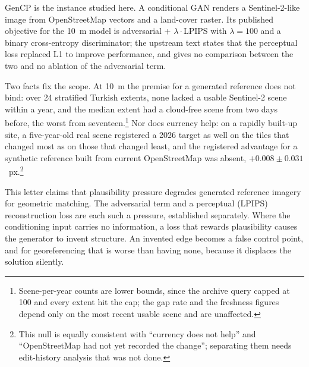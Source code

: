 GenCP \cite{guasch2026gencp} is the instance studied here. A conditional GAN
\cite{isola2017image} renders a Sentinel-2-like image from OpenStreetMap vectors and a
land-cover raster. Its published objective for the 10~m model is adversarial +
$\lambda\cdot$LPIPS \cite{zhang2018lpips} with $\lambda = 100$ and a binary
cross-entropy discriminator; the upstream text states that the perceptual loss replaced
L1 to improve performance, and gives no comparison between the two and no ablation of the
adversarial term.

Two facts fix the scope. At 10~m the premise for a generated reference does not
bind: over
24 stratified Turkish extents, none lacked a usable Sentinel-2 scene within a year, and the
median extent had a cloud-free scene from two days before, the worst from seventeen.\footnote{Scene-per-year
counts are lower bounds, since the archive query capped at 100 and every extent hit the
cap; the gap rate and the freshness figures depend only on the most recent usable scene
and are unaffected.} Nor does currency help: on a rapidly built-up site, a five-year-old
real scene registered a 2026 target as well on the tiles that changed most as on those
that changed least, and the registered advantage for a synthetic reference built from
current OpenStreetMap was absent, $+0.008 \pm 0.031$~px.\footnote{This null is equally
consistent with ``currency does not help'' and ``OpenStreetMap had not yet recorded the
change''; separating them needs edit-history analysis that was not done.}

This letter claims that plausibility pressure degrades generated reference imagery for
geometric matching. The adversarial term and a perceptual (LPIPS) reconstruction loss are
each such a pressure, established separately. Where the conditioning input carries no
information, a loss that rewards plausibility causes the generator to invent structure. An invented edge becomes a false control point, and for georeferencing that is worse than
having none, because it displaces the solution silently.


